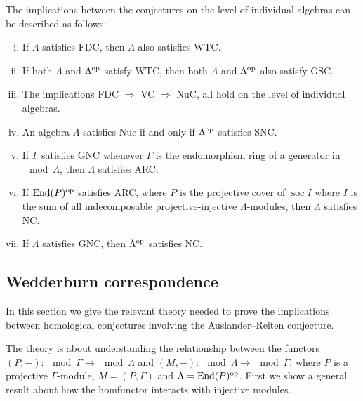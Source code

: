 \begin{prop}\label{prop:conj_on_individual_algebras}
	The implications between the conjectures on the level of individual algebras can be described as follows: 
	\begin{enumerate}[i)]
		\item If $\Lambda$ satisfies FDC, then $\Lambda$ also satisfies WTC.
		\item If both $\Lambda$ and $\Lambda^{\operatorname{op}}$ satisfy WTC, then both $\Lambda$ and $\Lambda^{\operatorname{op}}$ also satisfy GSC.
		\item The implications FDC $\Rightarrow$ VC $\Rightarrow$ NuC, all hold on the level of individual algebras.
		\item An algebra $\Lambda$ satisfies Nuc if and only if $\Lambda^{\operatorname{op}}$ satisfies SNC.
		\item If $\Gamma$ satisfies GNC whenever $\Gamma$ is the endomorphism ring of a generator in $\mod\Lambda$, then $\Lambda$ satisfies ARC.
		\item If $\operatorname{End}(P)^{\operatorname{op}}$ satisfies ARC, where $P$ is the projective cover of $\operatorname{soc}I$ where $I$ is the sum of all indecomposable projective-injective $\Lambda$-modules, then $\Lambda$ satisfies NC.
		\item If $\Lambda$ satisfies GNC, then $\Lambda^{\operatorname{op}}$ satisfies NC.
	\end{enumerate}
\end{prop}


\subsection{Wedderburn correspondence}\label{sec:wedderburn_correspondence}

In this section we give the relevant theory needed to prove the implications between homological conjectures involving the Auslander--Reiten conjecture.

The theory is about understanding the relationship between the functors $(P,-)\colon \mod \Gamma \to \mod\Lambda$ and $(M,-)\colon \mod\Lambda \to \mod\Gamma$, where $P$ is a projective $\Gamma$-module, $M=(P, \Gamma)$ and $\Lambda = \operatorname{End}(P)^{\operatorname{op}}$. First we show a general result about how the homfunctor interacts with injective modules.

